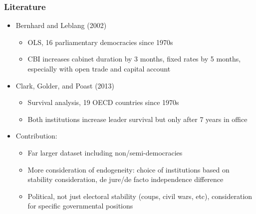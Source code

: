 \documentclass{beamer}
\begin{document}
    \begin{frame}
        \frametitle{Literature}
        \begin{itemize}
            \item Bernhard and Leblang (2002)
            \begin{itemize}
                \item OLS, 16 parliamentary democracies since 1970s
                \item CBI increases cabinet duration by 3 months, fixed rates by 5 months, especially with open trade and capital account
            \end{itemize}
            \item Clark, Golder, and Poast (2013)
            \begin{itemize}
                \item Survival analysis, 19 OECD countries since 1970s
                \item Both institutions increase leader survival but only after 7 years in office
            \end{itemize}
            \item Contribution:
            \begin{itemize}
                \item Far larger dataset including non/semi-democracies
                \item More consideration of endogeneity: choice of institutions based on stability consideration, de jure/de facto independence difference
                \item Political, not just electoral stability (coups, civil wars, etc), consideration for specific governmental positions
            \end{itemize}
        \end{itemize}
    \end{frame}
\end{document}

